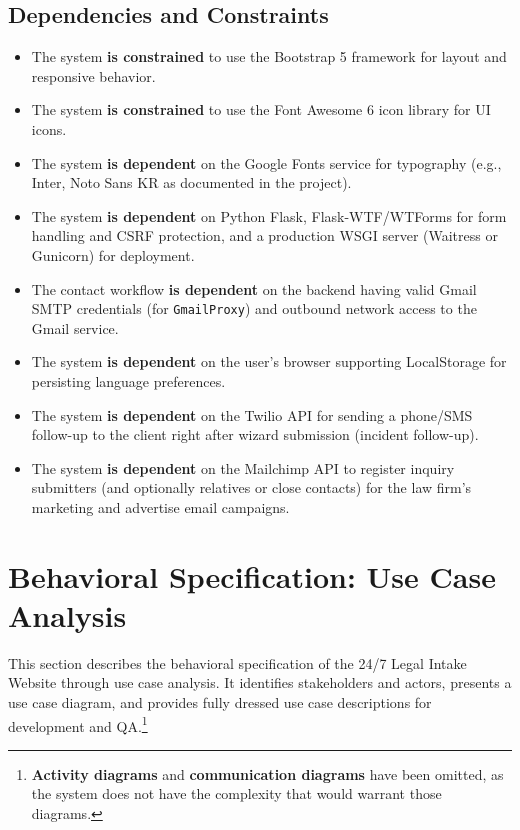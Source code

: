 \documentclass{article}
\begin{document}
\subsection{Dependencies and Constraints}
\begin{itemize}
  \item The system \textbf{is constrained} to use the Bootstrap 5 framework for layout and responsive behavior.
  \item The system \textbf{is constrained} to use the Font Awesome 6 icon library for UI icons.
  \item The system \textbf{is dependent} on the Google Fonts service for typography (e.g., Inter, Noto Sans KR as documented in the project).
  \item The system \textbf{is dependent} on Python Flask, Flask-WTF/WTForms for form handling and CSRF protection, and a production WSGI server (Waitress or Gunicorn) for deployment.
  \item The contact workflow \textbf{is dependent} on the backend having valid Gmail SMTP credentials (for \texttt{GmailProxy}) and outbound network access to the Gmail service.
  \item The system \textbf{is dependent} on the user's browser supporting LocalStorage for persisting language preferences.
  \item The system \textbf{is dependent} on the Twilio API for sending a phone/SMS follow-up to the client right after wizard submission (incident follow-up).
  \item The system \textbf{is dependent} on the Mailchimp API to register inquiry submitters (and optionally relatives or close contacts) for the law firm's marketing and advertise email campaigns.
\end{itemize}













\newpage
\section{Behavioral Specification: Use Case Analysis}\label{sec:usecases}
This section describes the behavioral specification of the 24/7 Legal Intake Website 
through use case analysis. It identifies stakeholders and actors, presents a 
use case diagram, and provides fully dressed use case descriptions for development and QA.\footnote{
  \textbf{Activity diagrams} and \textbf{communication diagrams} have been omitted, 
  as the system does not have the complexity that would warrant those diagrams.
}
\end{document}
